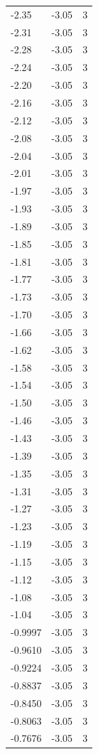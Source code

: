 \begin{longtable}{lrr}
  -2.35 & -3.05 & 3 \\
  -2.31 & -3.05 & 3 \\
  -2.28 & -3.05 & 3 \\
  -2.24 & -3.05 & 3 \\
  -2.20 & -3.05 & 3 \\
  -2.16 & -3.05 & 3 \\
  -2.12 & -3.05 & 3 \\
  -2.08 & -3.05 & 3 \\
  -2.04 & -3.05 & 3 \\
  -2.01 & -3.05 & 3 \\
  -1.97 & -3.05 & 3 \\
  -1.93 & -3.05 & 3 \\
  -1.89 & -3.05 & 3 \\
  -1.85 & -3.05 & 3 \\
  -1.81 & -3.05 & 3 \\
  -1.77 & -3.05 & 3 \\
  -1.73 & -3.05 & 3 \\
  -1.70 & -3.05 & 3 \\
  -1.66 & -3.05 & 3 \\
  -1.62 & -3.05 & 3 \\
  -1.58 & -3.05 & 3 \\
  -1.54 & -3.05 & 3 \\
  -1.50 & -3.05 & 3 \\
  -1.46 & -3.05 & 3 \\
  -1.43 & -3.05 & 3 \\
  -1.39 & -3.05 & 3 \\
  -1.35 & -3.05 & 3 \\
  -1.31 & -3.05 & 3 \\
  -1.27 & -3.05 & 3 \\
  -1.23 & -3.05 & 3 \\
  -1.19 & -3.05 & 3 \\
  -1.15 & -3.05 & 3 \\
  -1.12 & -3.05 & 3 \\
  -1.08 & -3.05 & 3 \\
  -1.04 & -3.05 & 3 \\
  -0.9997 & -3.05 & 3 \\
  -0.9610 & -3.05 & 3 \\
  -0.9224 & -3.05 & 3 \\
  -0.8837 & -3.05 & 3 \\
  -0.8450 & -3.05 & 3 \\
  -0.8063 & -3.05 & 3 \\
  -0.7676 & -3.05 & 3 \\

\end{longtable}
